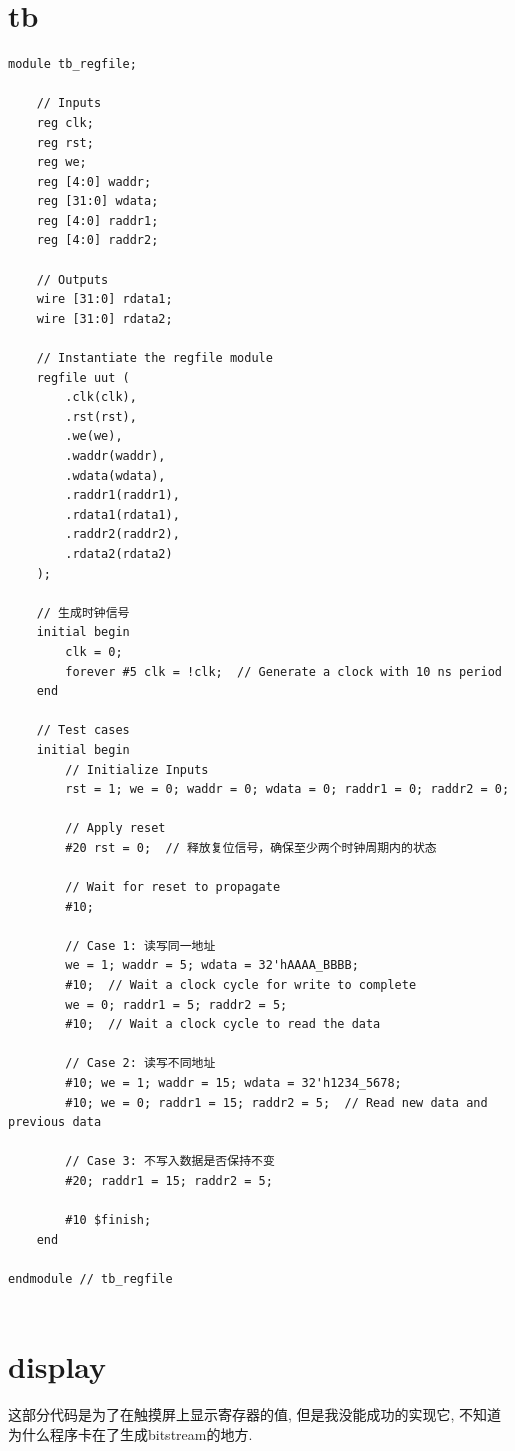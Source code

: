 \documentclass[AutoFakeBold]{LZUThesis}
\begin{document}
\section{tb}
\begin{lstlisting}[style={verilog-style}]
module tb_regfile;

    // Inputs
    reg clk;
    reg rst;
    reg we;
    reg [4:0] waddr;
    reg [31:0] wdata;
    reg [4:0] raddr1;
    reg [4:0] raddr2;

    // Outputs
    wire [31:0] rdata1;
    wire [31:0] rdata2;

    // Instantiate the regfile module
    regfile uut (
        .clk(clk),
        .rst(rst),
        .we(we),
        .waddr(waddr),
        .wdata(wdata),
        .raddr1(raddr1),
        .rdata1(rdata1),
        .raddr2(raddr2),
        .rdata2(rdata2)
    );

    // 生成时钟信号
    initial begin
        clk = 0;
        forever #5 clk = !clk;  // Generate a clock with 10 ns period
    end

    // Test cases
    initial begin
        // Initialize Inputs
        rst = 1; we = 0; waddr = 0; wdata = 0; raddr1 = 0; raddr2 = 0;

        // Apply reset
        #20 rst = 0;  // 释放复位信号，确保至少两个时钟周期内的状态

        // Wait for reset to propagate
        #10;

        // Case 1: 读写同一地址
        we = 1; waddr = 5; wdata = 32'hAAAA_BBBB;
        #10;  // Wait a clock cycle for write to complete
        we = 0; raddr1 = 5; raddr2 = 5;
        #10;  // Wait a clock cycle to read the data

        // Case 2: 读写不同地址
        #10; we = 1; waddr = 15; wdata = 32'h1234_5678;
        #10; we = 0; raddr1 = 15; raddr2 = 5;  // Read new data and previous data

        // Case 3: 不写入数据是否保持不变
        #20; raddr1 = 15; raddr2 = 5;

        #10 $finish;
    end

endmodule // tb_regfile
    
\end{lstlisting}

\section{display}
这部分代码是为了在触摸屏上显示寄存器的值, 
但是我没能成功的实现它, 不知道为什么程序卡在了生成bitstream的地方.
\end{document}
